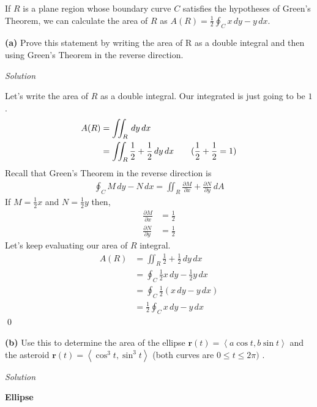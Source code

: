 \documentclass{article}
\newcommand{\lrp}[1]{\left( #1 \right)}
\newcommand{\lra}[1]{\left\langle #1 \right\rangle}
\renewcommand{\r}[0]{\mathbf{r}}
\newcommand{\Solution}{\textit{Solution}}
\begin{document}
If $R$ is a plane region whose boundary curve $C$ satisfies the hypotheses of Green's Theorem, we can calculate the area of $R$ as $\displaystyle A(R)=\frac{1}{2}\oint_C x\,dy-y\,dx$.

{}\textbf{(a)} Prove this statement by writing the area of R as a double integral and then using
Green’s Theorem in the reverse direction.

\Solution

Let's write the area of $R$ as a double integral. Our integrated is just going to be $1$.
\begin{align*}
    A(R)&=\iint_R\,dy\,dx\\
    &=\iint_R \frac{1}{2}+\frac{1}{2}\,dy\,dx\tag{$\displaystyle\frac{1}{2}+\frac{1}{2}=1$}
\end{align*}
Recall that Green's Theorem in the reverse direction is
\begin{align*}
     \oint_C M\,dy - N\,dx = \iint_R \frac{\partial M}{\partial x} + \frac{\partial N}{\partial y}\,dA\tag{yes, this is like flux}
\end{align*}
If $\displaystyle M=\frac{1}{2}x$ and $\displaystyle N=\frac{1}{2}y$ then,
\begin{align*}
\frac{\partial M}{\partial x}&=\frac{1}{2}\\
\frac{\partial N}{\partial y}&=\frac{1}{2}
\end{align*}
Let's keep evaluating our area of $R$ integral.
\begin{align*}
    A(R)&=\iint_R \frac{1}{2}+\frac{1}{2}\,dy\,dx\\
    &=\oint_C \frac{1}{2}x\,dy-\frac{1}{2}y\,dx\tag{Green's Theorem}\\
    &=\oint_C \frac{1}{2}\lrp{x\,dy-y\,dx}\\
    &=\frac{1}{2}\oint_C x\,dy-y\,dx\tag{we can take out constants}
\end{align*}
\qed

{}\textbf{(b)} Use this to determine the area of the ellipse $\r(t)=\lra{a\cos t,b\sin t}$ and the asteroid $\r(t)=\lra{\cos^3 t,\sin ^3 t}$ (both curves are $0\leq t\leq 2\pi)$
.

\Solution

{} \textbf{Ellipse}
\end{document}
